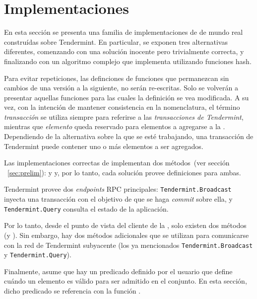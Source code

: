 \section{Implementaciones}\label{sec:impl}

En esta sección se presenta una familia de implementaciones de \setchain de mundo
real construídas sobre Tendermint. 
%
En particular, se exponen tres alternativas diferentes, comenzando con una
solución inocente pero
trivialmente correcta, y finalizando con un algoritmo
complejo que implementa \setchain utilizando funciones hash.
%

Para evitar repeticiones, las definciones de funciones que permanezcan sin cambios
de una versión a la siguiente, no serán re-escritas. Solo se volverán a presentar
aquellas funciones para las cuales la definición se vea modificada.
%
A su vez, con la intención de mantener consistencia en la nomenclatura, el término \textit{transacción}
se utiliza siempre para referirse a las \textit{transacciones de Tendermint}, mientras
que \textit{elemento} queda reservado para elementos a agregarse a la \setchain.
%
Dependiendo de la alternativa sobre la que se esté trabajando, una transacción de
Tendermint puede contener uno
o más elementos a ser agregados.


Las implementaciones correctas de \setchain implementan dos métodos~(ver sección
~\ref{sec:prelim}): \Add y \Get y, por lo tanto, cada solución provee definiciones
para ambas.
%

Tendermint provee dos \textit{endpoints} RPC principales: \texttt{Tendermint.Broadcast}
inyecta una transacción con el objetivo de que se haga \textit{commit} sobre ella, y
\texttt{Tendermint.Query} consulta el estado de la aplicación.
%

Por lo tanto, desde el punto de vista del cliente de la \setchain, solo existen dos
métodos (\Add y \Get).
%
Sin embargo, hay dos métodos adicionales que se utilizan para comunicarse con la
red de Tendermint subyacente (los ya mencionados \texttt{Tendermint.Broadcast} y
\texttt{Tendermint.Query}).
%

Finalmente, \setchain asume que hay un predicado definido por el usuario que define
cuándo un elemento es válido para ser admitido en el conjunto.
%
En esta sección, dicho predicado se referencia con la función \isValidElement.


